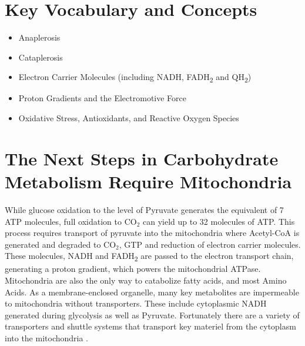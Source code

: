 \documentclass{tufte-handout}
\begin{document}
\section{Key Vocabulary and Concepts}
\begin{itemize}
	\item Anaplerosis
	\item Cataplerosis
	\item Electron Carrier Molecules (including NADH, FADH\textsubscript{2} and QH\textsubscript{2})
	\item Proton Gradients and the Electromotive Force
	\item Oxidative Stress, Antioxidants, and Reactive Oxygen Species
\end{itemize}

\section{The Next Steps in Carbohydrate Metabolism Require Mitochondria}
While glucose oxidation to the level of Pyruvate generates the equivalent of 7 ATP molecules, full oxidation to CO$_2$ can yield up to 32 molecules of ATP.  This process requires transport of pyruvate into the mitochondria where Acetyl-CoA is generated and degraded to CO$_2$, GTP and reduction of electron carrier molecules.  These molecules, NADH and FADH\textsubscript{2} are passed to the electron transport chain, generating a proton gradient, which powers the mitochondrial ATPase.  Mitochondria are also the only way to catabolize fatty acids, and most Amino Acids.  As a membrane-enclosed organelle, many key metabolites are impermeable to mitochondria without transporters.  These include cytoplasmic NADH generated during glycolysis as well as Pyruvate.  Fortunately there are a variety of transporters and shuttle systems that transport key materiel from the cytoplasm into the mitochondria .
\end{document}
